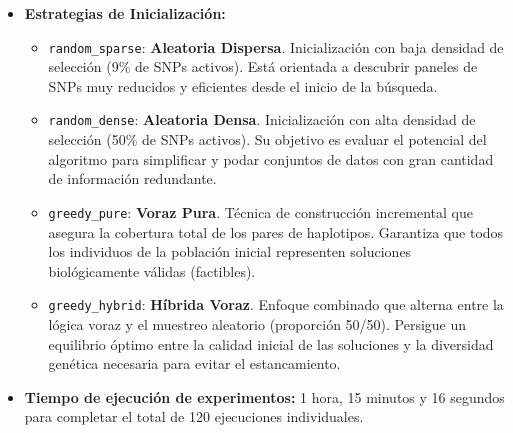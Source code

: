\documentclass[a4paper,10pt]{article} %
\begin{document}
\begin{itemize}
\begin{itemize}
\begin{itemize}
        \end{itemize}
        \item \textbf{Ajustes específicos de los algoritmos:}
        \begin{itemize}
            \item \textbf{NSGA-II / SPEA2:} Basados en ordenamiento por dominancia y densidad de soluciones.
            \item \textbf{NSGA-III:} 9 particiones por objetivo para generar un conjunto de 200 direcciones de referencia (Das-Dennis). Se incrementa la densidad de vectores respecto a A para mejorar la resolución.
            \item \textbf{MOEA/D (TCHE, PBI, WS):}
            \begin{itemize}
                \item \textbf{Tamaño del vecindario:} 15 subproblemas.
                \item \textbf{Probabilidad de selección en vecindad:} 90\%.
                \item \textbf{Valor de penalización PBI:} 5.0.
            \end{itemize}
        \end{itemize}
    \end{itemize}
    \item \textbf{Estrategias de Inicialización:}
    \begin{itemize}
        \item \texttt{random\_sparse}: \textbf{Aleatoria Dispersa}. Inicialización con baja densidad de selección (9\% de SNPs activos). Está orientada a descubrir paneles de SNPs muy reducidos y eficientes desde el inicio de la búsqueda.
        \item \texttt{random\_dense}: \textbf{Aleatoria Densa}. Inicialización con alta densidad de selección (50\% de SNPs activos). Su objetivo es evaluar el potencial del algoritmo para simplificar y podar conjuntos de datos con gran cantidad de información redundante.
        \item \texttt{greedy\_pure}: \textbf{Voraz Pura}. Técnica de construcción incremental que asegura la cobertura total de los pares de haplotipos. Garantiza que todos los individuos de la población inicial representen soluciones biológicamente válidas (factibles).
        \item \texttt{greedy\_hybrid}: \textbf{Híbrida Voraz}. Enfoque combinado que alterna entre la lógica voraz y el muestreo aleatorio (proporción 50/50). Persigue un equilibrio óptimo entre la calidad inicial de las soluciones y la diversidad genética necesaria para evitar el estancamiento.
    \end{itemize}
    \item \textbf{Tiempo de ejecución de experimentos:} 1 hora, 15 minutos y 16 segundos para completar el total de 120 ejecuciones individuales.
\end{itemize}
\end{document}
